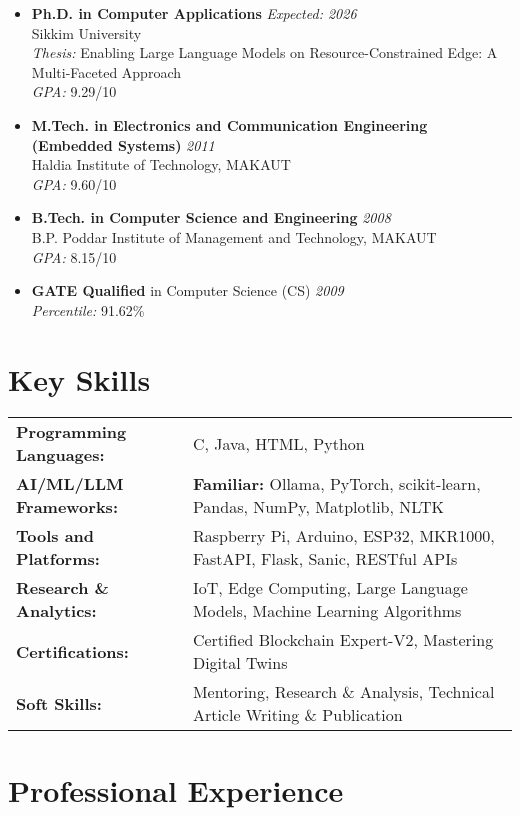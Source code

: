 \documentclass[10pt,a4paper]{article}
\begin{document}
	\begin{itemize}[leftmargin=0.15in]
		\item \textbf{Ph.D. in Computer Applications} \hfill \textit{Expected: 2026}\\
		Sikkim University \\
		\textit{Thesis:} Enabling Large Language Models on Resource-Constrained Edge: A Multi-Faceted Approach \\
		\textit{GPA:} 9.29/10
		\item \textbf{M.Tech. in Electronics and Communication Engineering (Embedded Systems)} \hfill \textit{2011}\\
		Haldia Institute of Technology, MAKAUT \\
		\textit{GPA:} 9.60/10
		\item \textbf{B.Tech. in Computer Science and Engineering} \hfill \textit{2008}\\
		B.P. Poddar Institute of Management and Technology, MAKAUT \\
		\textit{GPA:} 8.15/10
		\item \textbf{GATE Qualified} in Computer Science (CS) \hfill \textit{2009}\\
		\textit{Percentile:} 91.62\%
	\end{itemize}
	
	\section*{Key Skills}
	
	\begin{tabular}{ll}
		\textbf{Programming Languages:} &  C, Java, HTML, Python \\
		\textbf{AI/ML/LLM Frameworks:} & \textbf{Familiar:} Ollama, PyTorch, scikit-learn, Pandas, NumPy, Matplotlib, NLTK\\
	    \textbf{Tools and Platforms:} & Raspberry Pi, Arduino, ESP32, MKR1000, FastAPI, Flask, Sanic, RESTful APIs \\
		\textbf{Research \& Analytics:} & IoT, Edge Computing, Large Language Models, Machine Learning Algorithms \\
		\textbf{Certifications:} & Certified Blockchain Expert-V2, Mastering Digital Twins \\
		\textbf{Soft Skills:} & Mentoring, Research \& Analysis, Technical Article Writing \& Publication \\
	\end{tabular}
	
	\section*{Professional Experience}
	
\end{document}
